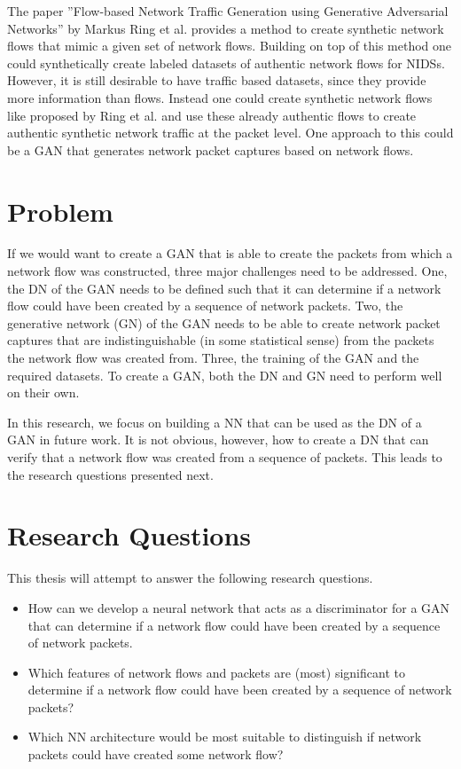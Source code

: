 \documentclass[
	ngerman,
	ruledheaders=section,%
	class=report,%
	thesis={type=bachelor},%
	accentcolor=9c,%
	custommargins=true,%
	marginpar=false,%
	parskip=half-,%
	fontsize=11pt,%
]{tudapub}
\begin{document}
The paper ''Flow-based Network Traffic Generation using Generative Adversarial Networks'' by Markus Ring et al. \cite{ringFlowbasedNetworkTraffic2019a} provides a method to create synthetic network flows that mimic a given set of network flows.
Building on top of this method one could synthetically create labeled datasets of authentic network flows for NIDSs.
However, it is still desirable to have traffic based datasets, since they provide more information than flows.
Instead one could create synthetic network flows like proposed by Ring et al. \cite{ringFlowbasedNetworkTraffic2019a} and
use these already authentic flows to create authentic synthetic network traffic at the packet level.
One approach to this could be a GAN that generates network packet captures based on network flows.

\section{Problem}

If we would want to create a GAN that is able to create the packets from which a network flow was constructed,
three major challenges need to be addressed.
One, the DN of the GAN needs to be defined such that it can determine if a network flow could have been created by a sequence of network packets.
Two, the generative network (GN) of the GAN needs to be able to create network packet captures that are indistinguishable (in some statistical sense) from the packets the network flow was created from.
Three, the training of the GAN and the required datasets.
To create a GAN, both the DN and GN need to perform well on their own.

In this research, we focus on building a NN that can be used as the DN of a GAN in future work.
It is not obvious, however, how to create a DN that
can verify that a network flow was created from a sequence of packets.
This leads to the research questions presented next.

\section{Research Questions}

This thesis will attempt to answer the following research questions.

\begin{itemize}
  \item How can we develop a neural network that acts as a discriminator for a GAN
  that can determine if a network flow could have been created by a sequence of network packets.
  \item Which features of network flows and packets are (most) significant to determine if a network flow could have been created by a sequence of network packets?
  \item Which NN architecture would be most suitable to distinguish if network packets could have created some network flow?
\end{itemize}
\end{document}
